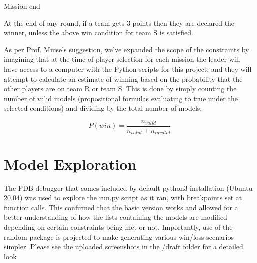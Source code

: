 \documentclass[pdftex,10pt,a4paper]{article}
\numberwithin{equation}{section} %
\begin{document}
Mission end\newline

At the end of any round, if a team gets 3 points then they are declared the \indent winner, unless the above win condition for team S is satisfied. \newline

As per Prof. Muise's suggestion, we've expanded the scope of the constraints by imagining that at the time of player selection for each mission the leader will have access to a computer with the Python scripts for this project, and they will attempt to calculate an estimate of winning based on the probability that the other players are on team R or team S. This is done by simply counting the number of valid models (propositional formulas evaluating to true under the selected conditions) and dividing by the total number of models:

\begin{equation}
	P(win)=\frac{n_{valid}}{n_{valid} + n_{invalid}}
\end{equation}

\section*{Model Exploration}
The PDB debugger that comes included by default python3 installation (Ubuntu 20.04) was used to explore the run.py script as it ran, with breakpoints set at function calls. This confirmed that the basic version works and allowed for a better understanding of how the lists containing the models are modified depending on certain constraints being met or not. Importantly, use of the random package is projected to make generating various win/loss scenarios simpler. Please see the uploaded screenshots in the /draft folder for a detailed look

\end{document}
